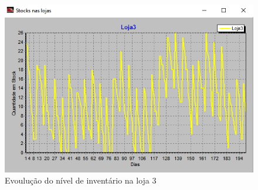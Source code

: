 \begin{figure}[<+htpb+>]
	\centering
	\includegraphics[scale=0.75]{./report-TP2/img/loja3.png}
	\caption{Evoulução do nível de inventário na loja 3}
\label{fig:figure4}
\end{figure}
